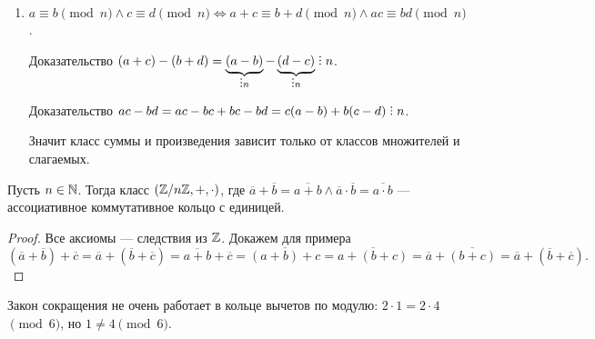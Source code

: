  \begin{enumerate}
     \item $a \equiv b \pmod{n} \land c \equiv d \pmod{n} \iff a+c \equiv b+d \pmod{n} \land ac \equiv bd \pmod{n}$. 

         Доказательство  $(a+c) - (b+d) = \underbrace{(a-b)}_{\divby n} - \underbrace{(d-c)}_{\divby n} \divby n$. 

         Доказательство $ac - bd = ac - bc + bc - bd = c (a-b) + b(c-d) \divby n$.

         Значит класс суммы и произведения зависит только от классов множителей и слагаемых.
\end{enumerate}
\begin{theorem}
    Пусть $n \in \mathbb{N}$. Тогда класс $(\mathbb{Z} / n\mathbb{Z}, +, \cdot)$, где $\overline{a}+\overline{b} = \overline{a+b} \land \overline{a} \cdot \overline{b} = \overline{a \cdot b}$ --- ассоциативное коммутативное кольцо с единицей.
\end{theorem}
\begin{proof}
    Все аксиомы --- следствия из $\mathbb{Z}$. Докажем для примера  $(\overline{a} + \overline{b}) + \overline{c} = \overline{a} + (\overline{b} + \overline{c}) = \overline{a+b} + \overline{c} = \overline{(a+b)+c} = \overline{a + (b+c)} = \overline{a} + \overline{(b+c)} = \overline{a} + (\overline{b} + \overline{c}).$
\end{proof}
\slashn
Закон сокращения не очень работает в кольце вычетов по модулю: $2 \cdot 1 = 2 \cdot 4$ $\pmod 6$, но  $1 \neq 4 \pmod 6$.

